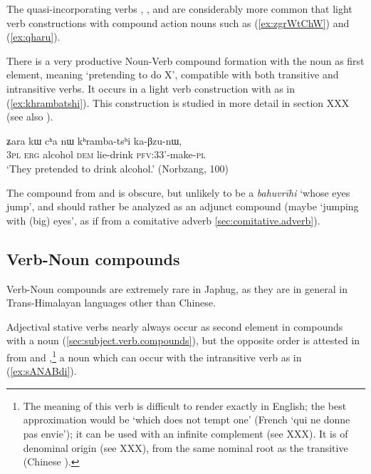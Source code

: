 The quasi-incorporating verbs , , and  are considerably more common that light verb constructions with compound action nouns such as (\ref{ex:zgrWtChW}) and (\ref{ex:qharu}).

There is a very productive Noun-Verb compound formation with the noun  as first element, meaning `pretending to do  X', compatible with both transitive and intransitive verbs. It occurs in a light verb construction with  as in (\ref{ex:khrambatshi}). This construction is studied in more detail in section XXX (see also \citealt[252]{jacques16complementation}).

\begin{exe}
\ex \label{ex:khrambatshi}
\gll ʑara kɯ cʰa nɯ kʰramba-tsʰi ka-βzu-nɯ,  \\
\textsc{3pl} \textsc{erg} alcohol \textsc{dem} lie-drink \textsc{pfv}:3\fl{}3'-make-\textsc{pl} \\
\glt `They pretended to drink alcohol.' (Norbzang, 100)
\end{exe}

The compound  from  and  is obscure, but unlikely to be a \textit{bahuvrīhi} `whose eyes jump', and should rather be analyzed as an adjunct compound (maybe `jumping with (big) eyes', as if from a comitative adverb \ref{sec:comitative.adverb}). 

\subsection{Verb-Noun compounds} \label{sec.v.n.compounds}
Verb-Noun compounds are extremely rare in Japhug, as they are in general in Trans-Himalayan languages other than Chinese.  

Adjectival stative verbs nearly always occur as second element in compounds with a noun (\ref{sec:subject.verb.compounds}), but the opposite order is attested in  from  and ,\footnote{The meaning of this verb is difficult to render exactly in English; the best approximation would be `which does not tempt one' (French `qui ne donne pas envie'); it can be used with an infinite complement (see XXX). It is of denominal origin (see XXX), from the same nominal root as the transitive  (Chinese ). }  a noun which can occur with the intransitive verb  as in (\ref{ex:sANABdi}).


